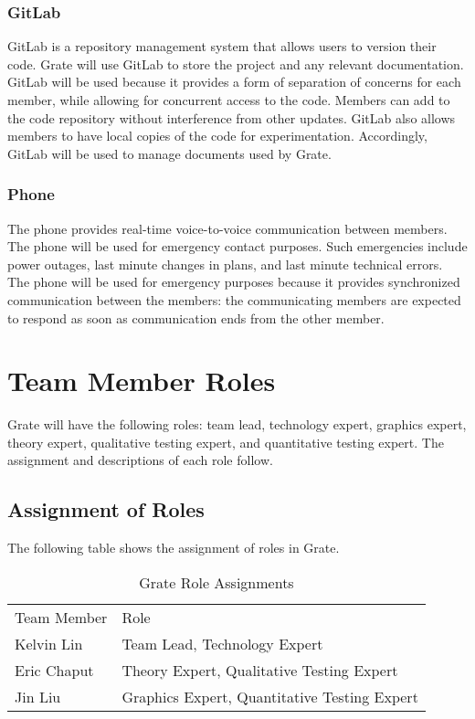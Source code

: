 \documentclass{article}
\begin{document}
\subsubsection{GitLab}
GitLab is a repository management system that allows users to version their 
code. Grate will use GitLab to store the project and any relevant 
documentation. GitLab will be used because it provides a form of separation of 
concerns for each member, while allowing for concurrent access to the code. 
Members can add to the code repository without interference from other updates. 
GitLab also allows members to have local copies of the code for experimentation. 
Accordingly, GitLab will be used to manage documents used by Grate.

\subsubsection{Phone}
The phone provides real-time voice-to-voice communication between members. The 
phone will be used for emergency contact purposes. Such emergencies include 
power outages, last minute changes in plans, and last minute technical errors. 
The phone will be used for emergency purposes because it provides synchronized 
communication between the members: the communicating members are expected to 
respond as soon as communication ends from the other member.

\section{Team Member Roles}
Grate will have the following roles: team lead, technology expert, graphics 
expert, theory expert, qualitative testing expert, and quantitative testing 
expert. The assignment and descriptions of each role follow.

\subsection{Assignment of Roles}
The following table shows the assignment of roles in Grate.

\begin{table}[h!]
	\begin{tabular}{ll}
		Team Member & Role                                        \\
		Kelvin Lin  & Team Lead, Technology Expert                \\
		Eric Chaput & Theory Expert, Qualitative Testing Expert  \\
		Jin Liu     & Graphics Expert, Quantitative Testing Expert
	\end{tabular}

	\caption{Grate Role Assignments}
\end{table}
\end{document}
